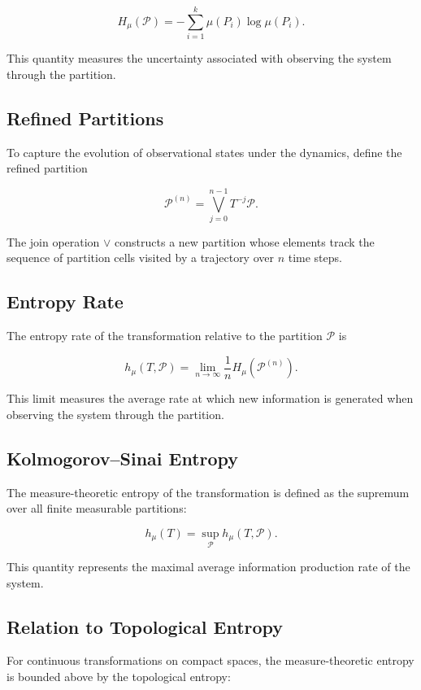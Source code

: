 \documentclass[12pt]{article}
\begin{document}
\[
H_\mu(\mathcal{P})
=
-
\sum_{i=1}^k
\mu(P_i)\log \mu(P_i).
\]

This quantity measures the uncertainty associated with observing the system through the partition.

\subsection{Refined Partitions}

To capture the evolution of observational states under the dynamics, define the refined partition

\[
\mathcal{P}^{(n)}
=
\bigvee_{j=0}^{n-1} T^{-j}\mathcal{P}.
\]

The join operation $\vee$ constructs a new partition whose elements track the sequence of partition cells visited by a trajectory over $n$ time steps.

\subsection{Entropy Rate}

The entropy rate of the transformation relative to the partition $\mathcal{P}$ is

\[
h_\mu(T,\mathcal{P})
=
\lim_{n\to\infty}
\frac{1}{n}
H_\mu\!\left(\mathcal{P}^{(n)}\right).
\]

This limit measures the average rate at which new information is generated when observing the system through the partition.

\subsection{Kolmogorov--Sinai Entropy}

The measure-theoretic entropy of the transformation is defined as the supremum over all finite measurable partitions:

\[
h_\mu(T)
=
\sup_{\mathcal{P}}
h_\mu(T,\mathcal{P}).
\]

This quantity represents the maximal average information production rate of the system.

\subsection{Relation to Topological Entropy}

For continuous transformations on compact spaces, the measure-theoretic entropy is bounded above by the topological entropy:
\end{document}
